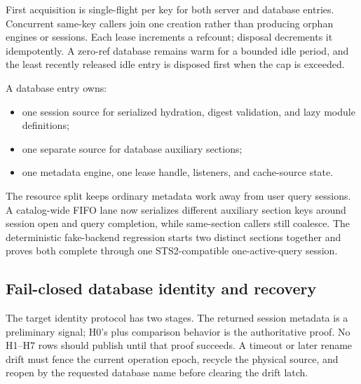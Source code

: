 \documentclass[11pt]{article}
\newcommand{\code}[1]{\texttt{\detokenize{#1}}}
\begin{document}
First acquisition is single-flight per key for both server and database entries. Concurrent same-key callers join one creation rather than producing orphan engines or sessions. Each lease increments a refcount; disposal decrements it idempotently. A zero-ref database remains warm for a bounded idle period, and the least recently released idle entry is disposed first when the cap is exceeded.

A database entry owns:

\begin{itemize}
  \item one session source for serialized hydration, digest validation, and lazy module definitions;
  \item one separate source for database auxiliary sections;
  \item one metadata engine, one lease handle, listeners, and cache-source state.
\end{itemize}

The resource split keeps ordinary metadata work away from user query sessions. A catalog-wide FIFO lane now serializes different auxiliary section keys around session open and query completion, while same-section callers still coalesce. The deterministic fake-backend regression starts two distinct sections together and proves both complete through one STS2-compatible one-active-query session.

\subsection{Fail-closed database identity and recovery}

The target identity protocol has two stages. The returned session metadata is a preliminary signal; H0's \code{DB_NAME()} plus \code{CATALOG_DEFAULT} comparison behavior is the authoritative proof. No H1--H7 rows should publish until that proof succeeds. A timeout or later rename drift must fence the current operation epoch, recycle the physical source, and reopen by the requested database name before clearing the drift latch.
\end{document}
